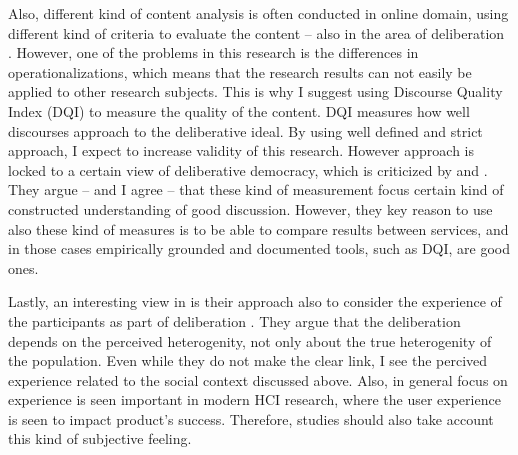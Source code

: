 \documentclass{article}
\begin{document}
Also, different kind of content analysis is often conducted in online domain, using different kind of criteria to evaluate the content -- also in the area of deliberation \cite{x,y,z}. However, one of the problems in this research is the differences in operationalizations, which means that the research results can not easily be applied to other research subjects. This is why I suggest using   Discourse Quality Index (DQI) to measure the quality of the content. DQI measures how well discourses approach to the deliberative ideal. By using well defined and strict approach, I expect to increase validity of this research. However  approach is locked to a certain view of deliberative democracy, which is criticized by  and . They argue -- and I agree -- that these kind of measurement focus certain kind of constructed understanding of good discussion. However, they key reason to use also these kind of measures is to be able to compare results between services, and in those cases empirically grounded and documented tools, such as DQI, are good ones.

Lastly, an interesting view in  is their approach also to consider the experience of the participants as part of deliberation . They argue that the deliberation depends on the perceived heterogenity, not only about the true heterogenity of the population. Even while they do not make the clear link, I see the percived experience related to the social context discussed above. Also, in general focus on experience is seen important in modern HCI research, where the user experience is seen to impact product's success. Therefore, studies should also take account this kind of subjective feeling.

\newpage



\end{document}
